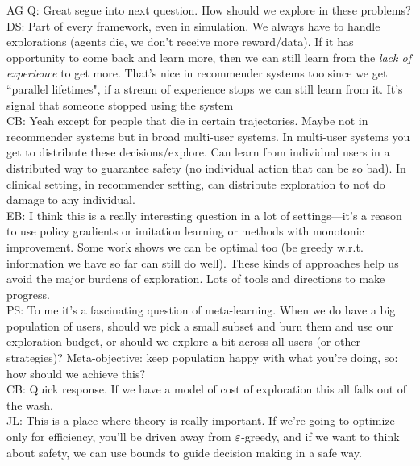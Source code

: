 \spacerule

AG Q: Great segue into next question. How should we explore in these problems? \\

DS: Part of every framework, even in simulation. We always have to handle explorations (agents die, we don't receive more reward/data). If it has opportunity to come back and learn more, then we can still learn from the {\it lack of experience} to get more. That's nice in recommender systems too since we get ``parallel lifetimes", if a stream of experience stops we can still learn from it. It's signal that someone stopped using the system \\

CB: Yeah except for people that die in certain trajectories. Maybe not in recommender systems but in broad multi-user systems. In multi-user systems you get to distribute these decisions/explore. Can learn from individual users in a distributed way to guarantee safety (no individual action that can be so bad). In clinical setting, in recommender setting, can distribute exploration to not do damage to any individual. \\

EB: I think this is a really interesting question in a lot of settings---it's a reason to use policy gradients or imitation learning or methods with monotonic improvement. Some work shows we can be optimal too (be greedy w.r.t. information we have so far can still do well). These kinds of approaches help us avoid the major burdens of exploration. Lots of tools and directions to make progress. \\

PS: To me it's a fascinating question of meta-learning. When we do have a big population of users, should we pick a small subset and burn them and use our exploration budget, or should we explore a bit across all users (or other strategies)? Meta-objective: keep population happy with what you're doing, so: how should we achieve this? \\

CB: Quick response. If we have a model of cost of exploration this all falls out of the wash.\\

JL: This is a place where theory is really important. If we're going to optimize only for efficiency, you'll be driven away from $\varepsilon$-greedy, and if we want to think about safety, we can use bounds to guide decision making in a safe way. \\

